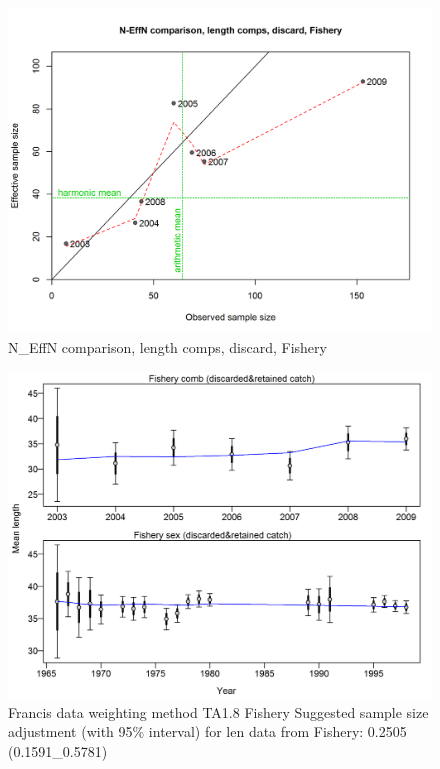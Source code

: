 \documentclass[12pt,]{article}
\begin{document}
\begin{figure}
\centering
\includegraphics{./r4ss/plots_mod1/comp_lenfit_sampsize_flt1mkt1.png}
\caption{N\_EffN comparison, length comps, discard, Fishery
\label{fig:mod1_3_comp_lenfit_sampsize_flt1mkt1}}
\end{figure}

\begin{figure}
\centering
\includegraphics{./r4ss/plots_mod1/comp_lenfit_data_weighting_TA1.8_Fishery.png}
\caption{Francis data weighting method TA1.8 Fishery Suggested sample
size adjustment (with 95\% interval) for len data from Fishery: 0.2505
(0.1591\_0.5781)
\label{fig:mod1_4_comp_lenfit_data_weighting_TA1.8_Fishery}}
\end{figure}
\end{document}
